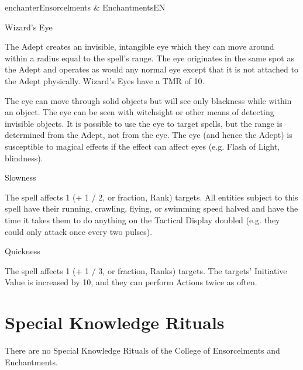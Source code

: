 \begin{College}[1.1]{enchanter}{Ensorcelments \& Enchantments}{EN}
\begin{spell}[S-10]{Wizard’s Eye}
\begin{effects}
The Adept creates an invisible, intangible eye which they can move
around within a radius equal to the spell’s range. The eye originates
in the same spot as the Adept and operates as would any normal eye
except that it is not attached to the Adept physically.  Wizard’s Eyes
have a TMR of 10.

The eye can move through solid objects but will see only blackness
while within an object. The eye can be seen with witchsight or other
means of detecting invisible objects. It is possible to use the eye to
target spells, but the range is determined from the Adept, not from
the eye.  The eye (and hence the Adept) is susceptible to magical
effects if the effect can affect eyes (e.g.  Flash of Light,
blindness).
\end{effects}
\end{spell}

\begin{spell}[S-11]{Slowness}

\begin{effects}
The spell affects 1 (+ 1 / 2, or fraction, Rank) targets.  All
entities subject to this spell have their running, crawling, flying,
or swimming speed halved and have the time it takes them to do
anything on the Tactical Display doubled (e.g.  they could only attack
once every two pulses).
\end{effects}
\end{spell}

\begin{spell}[S-12]{Quickness}

\begin{effects}
The spell affects 1 (+ 1 / 3, or fraction, Ranks) targets.  The
targets’ Initiative Value is increased by 10, and they can perform
Actions twice as often.
\end{effects}
\end{spell}


\section{Special Knowledge Rituals}

There are no Special Knowledge Rituals of the College of Ensorcelments
and Enchantments.

\end{College}
